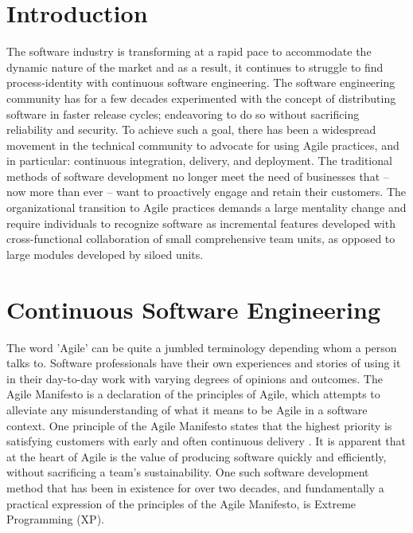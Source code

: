 \documentclass[12pt,a4paper]{article}
\begin{document}

\newpage
\section{Introduction}
The software industry is transforming at a rapid pace to accommodate the dynamic nature of the market and as a result, it continues to struggle to find process-identity with continuous software engineering. The software engineering community has for a few decades experimented with the concept of distributing software in faster release cycles; endeavoring to do so without sacrificing reliability and security. To achieve such a goal, there has been a widespread movement in the technical community to advocate for using Agile practices, and in particular: continuous integration, delivery, and deployment. The traditional methods of software development no longer meet the need of businesses that -- now more than ever -- want to proactively engage and retain their customers. The organizational transition to Agile practices demands a large mentality change and require individuals to recognize software as incremental features developed with cross-functional collaboration of small comprehensive team units, as opposed to large modules developed by siloed units.

\section{Continuous Software Engineering}
The word 'Agile' can be quite a jumbled terminology depending whom a person talks to. Software professionals have their own experiences and stories of using it in their day-to-day work with varying degrees of opinions and outcomes. The Agile Manifesto is a declaration of the principles of Agile, which attempts to alleviate any misunderstanding of what it means to be Agile in a software context. One principle of the Agile Manifesto states that the highest priority is satisfying customers with early and often continuous delivery \cite[p. ~50]{meyer_2014}. It is apparent that at the heart of Agile is the value of producing software quickly and efficiently, without sacrificing a team's sustainability. One such software development method that has been in existence for over two decades, and fundamentally a practical expression of the principles of the Agile Manifesto, is Extreme Programming (XP).
\end{document}
